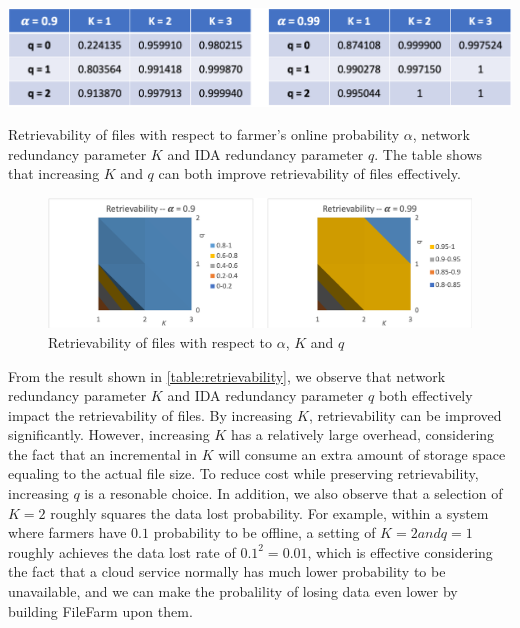 \begin{table}[hbt]
  \centering
    \includegraphics[width=14cm]{tables/table_retrievability.png}
    \caption[Retrievability of files with respect to farmer's online probability $\alpha$, network redundancy parameter $K$ and IDA redundancy parameter $q$]{Retrievability of files with respect to farmer's online probability $\alpha$, network redundancy parameter $K$ and IDA redundancy parameter $q$. The table shows that increasing $K$ and $q$ can both improve retrievability of files effectively.}
    \label{table:retrievability}
\end{table}
  
\begin{figure}[hbt]
  \centering
    \includegraphics[width=14cm]{charts/chart_retrievability.png}
    \caption{Retrievability of files with respect to $\alpha$, $K$ and $q$}
    \label{fig:retrievability}
\end{figure}

From the result shown in \ref{table:retrievability}, we observe that network redundancy parameter $K$ and IDA redundancy parameter $q$ both effectively impact the retrievability of files. By increasing $K$, retrievability can be improved significantly. However, increasing $K$ has a relatively large overhead, considering the fact that an incremental in $K$ will consume an extra amount of storage space equaling to the actual file size. To reduce cost while preserving retrievability, increasing $q$ is a resonable choice. In addition, we also observe that a selection of $K=2$ roughly squares the data lost probability. For example, within a system where farmers have $0.1$ probability to be offline, a setting of $K=2 and q=1$ roughly achieves the data lost rate of $0.1^{2}=0.01$, which is effective considering the fact that a cloud service normally has much lower probability to be unavailable, and we can make the probalility of losing data even lower by building FileFarm upon them.

